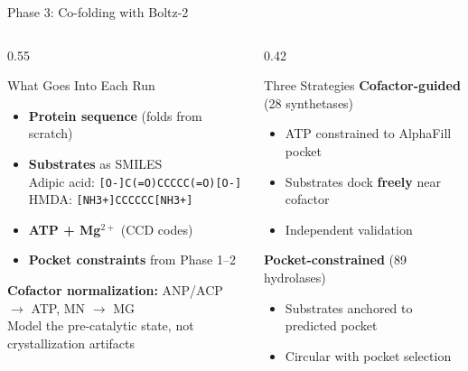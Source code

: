 \documentclass[aspectratio=169, 11pt]{beamer}
\begin{document}
\begin{frame}{Phase 3: Co-folding with Boltz-2}
\vspace{-6pt}

\begin{columns}[T]
\begin{column}{0.55\textwidth}
\begin{block}{What Goes Into Each Run}
\begin{itemize}\small
\item \textbf{Protein sequence} (folds from scratch)
\item \textbf{Substrates} as SMILES\\
  {\scriptsize Adipic acid: \texttt{[O-]C(=O)CCCCC(=O)[O-]}}\\
  {\scriptsize HMDA: \texttt{[NH3+]CCCCCC[NH3+]}}
\item \textbf{ATP + Mg$^{2+}$} (CCD codes)
\item \textbf{Pocket constraints} from Phase 1--2
\end{itemize}
\end{block}

\vspace{2pt}
\colorbox{lightblue!50}{\parbox{0.92\textwidth}{\centering\small
\textbf{Cofactor normalization:} ANP/ACP $\rightarrow$ ATP, MN $\rightarrow$ MG\\
Model the pre-catalytic state, not crystallization artifacts
}}
\end{column}

\begin{column}{0.42\textwidth}
\begin{exampleblock}{Three Strategies}
\textbf{Cofactor-guided} {\small (28 synthetases)}
\begin{itemize}\scriptsize
\item ATP constrained to AlphaFill pocket
\item Substrates dock \textbf{freely} near cofactor
\item \textcolor{accentgreen}{Independent validation}
\end{itemize}

\vspace{2pt}
\textbf{Pocket-constrained} {\small (89 hydrolases)}
\begin{itemize}\scriptsize
\item Substrates anchored to predicted pocket
\item \textcolor{accentorange}{Circular with pocket selection}
\end{itemize}


\end{exampleblock}
\end{column}
\end{columns}
\end{frame}
\end{document}
